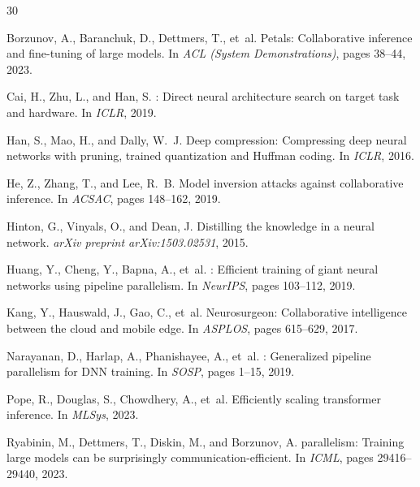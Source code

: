 \documentclass[11pt,a4paper]{article}
\begin{document}


\begin{thebibliography}{30}

Borzunov, A., Baranchuk, D., Dettmers, T., et~al.
\newblock Petals: Collaborative inference and fine-tuning of large models.
\newblock In \emph{ACL (System Demonstrations)}, pages 38--44, 2023.

Cai, H., Zhu, L., and Han, S.
: Direct neural architecture search on target task and hardware.
\newblock In \emph{ICLR}, 2019.

Han, S., Mao, H., and Dally, W.~J.
\newblock Deep compression: Compressing deep neural networks with pruning, trained quantization and {Huffman} coding.
\newblock In \emph{ICLR}, 2016.

He, Z., Zhang, T., and Lee, R.~B.
\newblock Model inversion attacks against collaborative inference.
\newblock In \emph{ACSAC}, pages 148--162, 2019.

Hinton, G., Vinyals, O., and Dean, J.
\newblock Distilling the knowledge in a neural network.
\newblock \emph{arXiv preprint arXiv:1503.02531}, 2015.

Huang, Y., Cheng, Y., Bapna, A., et~al.
: Efficient training of giant neural networks using pipeline parallelism.
\newblock In \emph{NeurIPS}, pages 103--112, 2019.

Kang, Y., Hauswald, J., Gao, C., et~al.
\newblock Neurosurgeon: Collaborative intelligence between the cloud and mobile edge.
\newblock In \emph{ASPLOS}, pages 615--629, 2017.

Narayanan, D., Harlap, A., Phanishayee, A., et~al.
: Generalized pipeline parallelism for {DNN} training.
\newblock In \emph{SOSP}, pages 1--15, 2019.

Pope, R., Douglas, S., Chowdhery, A., et~al.
\newblock Efficiently scaling transformer inference.
\newblock In \emph{MLSys}, 2023.

Ryabinin, M., Dettmers, T., Diskin, M., and Borzunov, A.
 parallelism: Training large models can be surprisingly communication-efficient.
\newblock In \emph{ICML}, pages 29416--29440, 2023.


\end{thebibliography}
\end{document}

